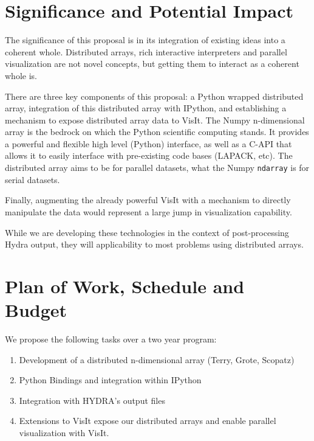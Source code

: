\documentclass[a4paper]{article}
\begin{document}






\section*{Significance and Potential Impact}
The significance of this proposal is in its integration of existing ideas into a coherent whole.  Distributed arrays, rich interactive interpreters and parallel visualization are not novel concepts, but getting them to interact as a coherent whole is.

There are three key components of this proposal: a Python wrapped distributed array, integration of this distributed array with IPython, and establishing a mechanism to expose distributed array data to VisIt.  The Numpy n-dimensional array is the bedrock on which the Python scientific computing stands.  It provides a powerful and flexible high level (Python) interface, as well as a C-API that allows it to easily interface with pre-existing code bases (LAPACK, etc).  The distributed array aims to be for parallel datasets, what the Numpy \texttt{ndarray} is for serial datasets.

Finally, augmenting the already powerful VisIt with a mechanism to directly manipulate the data would represent a large jump in visualization capability.

While we are developing these technologies in the context of post-processing Hydra output, they will applicability to most problems using distributed arrays.



\section*{Plan of Work, Schedule and Budget}

We propose the following tasks over a two year program:

\begin{enumerate}
	\item Development of a distributed n-dimensional array (Terry, Grote, Scopatz)

	\item Python Bindings and integration within IPython

	\item Integration with HYDRA's output files

	\item Extensions to VisIt expose our distributed arrays and enable parallel visualization with VisIt.
\end{enumerate}
\end{document}
